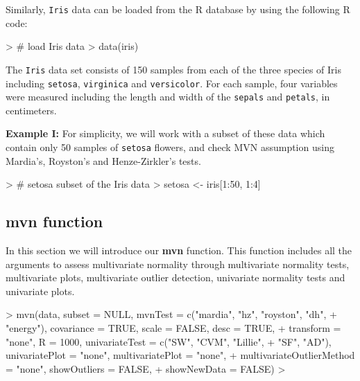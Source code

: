 \documentclass[11pt]{article}
\begin{document}
Similarly, \texttt{Iris} data can be loaded from the R database by using the following R code:


\begin{Schunk}
\begin{Sinput}
> # load Iris data
> data(iris)
\end{Sinput}
\end{Schunk}

The \texttt{Iris} data set consists of 150 samples from each of the three species of Iris including \texttt{setosa}, \texttt{virginica} and \texttt{versicolor}. For each sample, four variables were measured including the length and width of the \texttt{sepals} and \texttt{petals}, in centimeters. \\
\newline

\textbf{Example I:} For simplicity, we will work with a subset of these data which contain only 50 samples of \texttt{setosa} flowers, and check MVN assumption using Mardia's, Royston's and Henze-Zirkler's tests.


\begin{Schunk}
\begin{Sinput}
> # setosa subset of the Iris data
> setosa <- iris[1:50, 1:4]
\end{Sinput}
\end{Schunk}

\subsection{mvn function} \label{subsec:mvntexttt}
In this section we will introduce our \textbf{mvn} function. This function includes all the arguments to assess multivariate normality through  multivariate normality tests, multivariate plots, multivariate outlier detection, univariate normality tests and univariate plots.


\begin{Schunk}
\begin{Sinput}
> mvn(data, subset = NULL, mvnTest = c("mardia", "hz", "royston", "dh",
+   "energy"), covariance = TRUE, scale = FALSE, desc = TRUE,
+   transform = "none", R = 1000, univariateTest = c("SW", "CVM", "Lillie",
+   "SF", "AD"), univariatePlot = "none", multivariatePlot = "none",
+   multivariateOutlierMethod = "none", showOutliers = FALSE,
+   showNewData = FALSE)
> 
\end{Sinput}
\end{Schunk}
\end{document}
